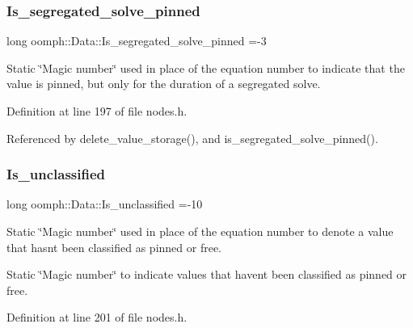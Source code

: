\mbox{\label{classoomph_1_1Data_ad83f76cbcd76d8ed96aca53dd04d5abf}} 
\subsubsection{\texorpdfstring{Is\+\_\+segregated\+\_\+solve\+\_\+pinned}{Is\_segregated\_solve\_pinned}}
{\footnotesize\ttfamily long oomph\+::\+Data\+::\+Is\+\_\+segregated\+\_\+solve\+\_\+pinned =-\/3\hspace{0.3cm}{\ttfamily [static]}}



Static \char`\"{}\+Magic number\char`\"{} used in place of the equation number to indicate that the value is pinned, but only for the duration of a segregated solve. 



Definition at line 197 of file nodes.\+h.



Referenced by delete\+\_\+value\+\_\+storage(), and is\+\_\+segregated\+\_\+solve\+\_\+pinned().

\mbox{\label{classoomph_1_1Data_ac56011da9a923069793ecc3cb54f5e20}} 
\subsubsection{\texorpdfstring{Is\+\_\+unclassified}{Is\_unclassified}}
{\footnotesize\ttfamily long oomph\+::\+Data\+::\+Is\+\_\+unclassified =-\/10\hspace{0.3cm}{\ttfamily [static]}}



Static \char`\"{}\+Magic number\char`\"{} used in place of the equation number to denote a value that hasn\textquotesingle{}t been classified as pinned or free. 

Static \char`\"{}\+Magic number\char`\"{} to indicate values that haven\textquotesingle{}t been classified as pinned or free. 

Definition at line 201 of file nodes.\+h.



